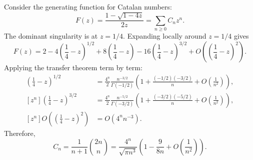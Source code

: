 \begin{example}
    Consider the generating function for Catalan numbers:
    \[
        F(z) = \frac{1 - \sqrt{1 - 4z}}{2z} = \sum_{n \ge 0} C_n z^n.
    \]
    The dominant singularity is at \(z = 1/4\).
    Expanding locally around \(z = 1/4\) gives
    \[
        F(z) = 2 - 4\left(\frac{1}{4} - z\right)^{1/2} + 8\left(\frac{1}{4} - z\right) - 16\left(\frac{1}{4} - z\right)^{3/2} + O\left(\left(\frac{1}{4} - z\right)^2\right).
    \]
    Applying the transfer theorem term by term:
    \begin{align*}
        [z^n] \left(\frac{1}{4} - z\right)^{1/2} &= \frac{4^n}{2} \frac{n^{-3/2}}{\Gamma(-1/2)} \left( 1 + \frac{(-1/2)(-3/2)}{n} + O\left(\frac{1}{n^2}\right) \right), \\
        [z^n] \left(\frac{1}{4} - z\right)^{3/2} &= \frac{4^n}{2} \frac{n^{-5/2}}{\Gamma(-3/2)} \left( 1 + \frac{(-3/2)(-5/2)}{n} + O\left(\frac{1}{n^2}\right) \right), \\
        [z^n] O\left(\left(\frac{1}{4} - z\right)^2\right) &= O\left(4^n n^{-3}\right).
    \end{align*}
    Therefore,
    \[
        C_n = \frac{1}{n+1} \binom{2n}{n} = \frac{4^n}{\sqrt{\pi n^3}} \left( 1 - \frac{9}{8n} + O\left(\frac{1}{n^2}\right) \right).
    \]
\end{example}
